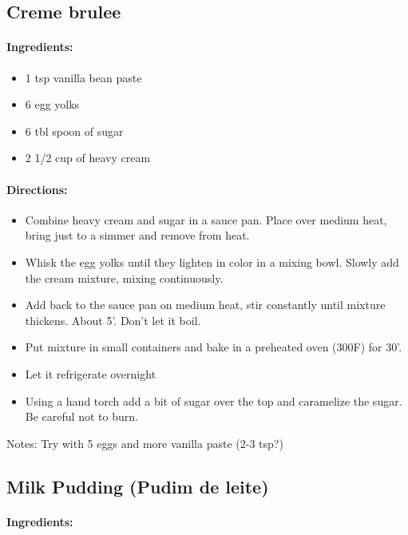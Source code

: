\documentclass{article}
\begin{document}
\subsection{Creme brulee}

\paragraph{Ingredients:}

\begin{itemize}
\item 1 tsp vanilla bean paste
\item 6 egg yolks
\item 6 tbl spoon of sugar
\item 2 1/2 cup of heavy cream
\end{itemize}

\paragraph{Directions:}
\begin{itemize}
\item Combine heavy cream and sugar in a sauce pan. Place over medium heat, bring just to a simmer and remove from heat.

\item Whisk the egg yolks until they lighten in color in a mixing bowl. Slowly add the cream mixture, mixing continuously.
\item Add back to the sauce pan on medium heat, stir constantly until mixture thickens. About 5'. Don't let it boil.
\item Put mixture in small containers and bake in a preheated oven (300F) for 30'. 
\item Let it refrigerate overnight
\item Using a hand torch add a bit of sugar over the top and caramelize the sugar. Be careful not to burn.
\end{itemize}

Notes: Try with 5 eggs and more vanilla paste (2-3 tsp?)

\subsection{Milk Pudding (Pudim de leite)}

\paragraph{Ingredients:}
\end{document}

